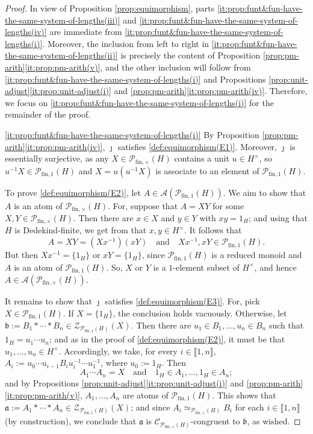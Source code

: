 \documentclass{report}
\newcommand{\llb}{\llbracket}
\newcommand{\rrb}{\rrbracket}
\newcommand{\funt}{{\textrm{fin}, \times}}
\newcommand{\fun}{{\textrm{fin}, 1}}
\renewcommand{\:}{\text{:}}
\theoremstyle{definition}
\begin{document}
\begin{proof}
	In view of Proposition \ref{prop:equimorphism}, parts \ref{it:prop:funt&fun-have-the-same-system-of-lengths(iii)} and \ref{it:prop:funt&fun-have-the-same-system-of-lengths(iv)} are immediate from \ref{it:prop:funt&fun-have-the-same-system-of-lengths(i)}.
	Moreover, the inclusion from left to right in \ref{it:prop:funt&fun-have-the-same-system-of-lengths(ii)} is precisely the content of Proposition \ref{prop:pm-arith}\ref{it:prop:pm-arith(v)}, and the other inclusion will follow from \ref{it:prop:funt&fun-have-the-same-system-of-lengths(i)} and Propositions \ref{prop:unit-adjust}\ref{it:prop:unit-adjust(i)} and \ref{prop:pm-arith}\ref{it:prop:pm-arith(iv)}.
	Therefore, we focus on \ref{it:prop:funt&fun-have-the-same-system-of-lengths(i)} for the remainder of the proof.
	
	\ref{it:prop:funt&fun-have-the-same-system-of-lengths(i)} By Proposition \ref{prop:pm-arith}\ref{it:prop:pm-arith(iv)}, $\jmath$ satisfies \ref{def:equimorphism(E1)}.
	Moreover, $\jmath$ is essentially surjective, as any $X\in \mathcal P_\funt(H)$ contains a unit $u \in H^\times$, so $u^{-1}X\in \mathcal P_\fun(H)$ and $X = u(u^{-1}X)$ is associate to an element of $\mathcal P_\fun(H)$. 
	
	To prove \ref{def:equimorphism(E2)}, let $A\in\mathscr{A}(\mathcal P_\fun(H))$.
	We aim to show that $A$ is an atom of $\mathcal P_\funt(H)$. For, suppose that $A = XY$ for some $X,Y\in \mathcal P_\funt(H)$. Then there are $x \in X$ and $y \in Y$ with
	$xy=1_H$; and using that $H$ is Dedekind-finite, we get from \cite[Lemma 2.30]{fan-tringali18} that $x,y\in H^\times$.
	It follows that 
	\[
	A = XY = (Xx^{-1})(xY)
	\quad\text{and}\quad
	Xx^{-1}, xY\in \mathcal P_\fun(H). 
	\]
	But then
	$Xx^{-1} = \{1_H\}$ or $xY = \{1_H\}$, since $\mathcal P_\fun(H)$ is a reduced monoid and $A$ is an atom of $\mathcal P_\fun(H)$.
	So, $X$ or $Y$ is a $1$-element subset of $H^\times$, and hence $A \in \mathscr A(\mathcal P_\funt(H))$. 
	
	
	It remains to show that $\jmath$ satisfies \ref{def:equimorphism(E3)}. For, pick $X \in \mathcal P_\fun(H)$. If $X = \{1_H\}$, the conclusion holds vacuously. Otherwise, let $\mathfrak{b} := B_1*\cdots*B_n \in \mathcal Z_{\mathcal P_\fun(H)}(X)$. Then there are $u_1\in B_1,\ldots, u_n\in B_n$ such that $1_H = u_1\cdots u_n$; and as in the proof of \ref{def:equimorphism(E2)}, it must be that $u_1,\ldots, u_n\in H^\times$.
	Accordingly, we take, for every $i \in \llb 1, n \rrb$, $A_i := u_0 \cdots u_{i-1} B_i u_i^{-1} \cdots u_1^{-1}$, where $u_0 := 1_H$.
	Then 
	\[
	A_1 \cdots A_n = X
	\quad\text{and}\quad
	1_H \in A_1, \ldots, 1_H \in A_n;
	\]
	and by Propositions \ref{prop:unit-adjust}\ref{it:prop:unit-adjust(i)} and \ref{prop:pm-arith}\ref{it:prop:pm-arith(v)}, $A_1, \ldots, A_n$ are atoms of $\mathcal P_{\fun}(H)$. This shows that $\mathfrak{a}:= A_1*\cdots * A_n \in \mathcal{Z}_{\mathcal P_\fun(H)}(X)$; and since $A_i \simeq_{\mathcal P_\funt(H)} B_i$ for each $i \in \llb 1, n \rrb$ (by construction), we conclude that $\mathfrak{a}$ is $\mathscr{C}_{\mathcal P_{\funt}(H)}$-congruent to $\mathfrak{b}$, as wished.
\end{proof} 
\end{document}
